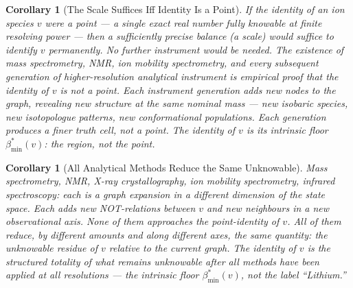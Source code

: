 \documentclass[11pt,twocolumn,a4paper]{article}
\theoremstyle{plain}
\newtheorem{corollary}[theorem]{Corollary}
\theoremstyle{definition}
\theoremstyle{remark}
\newcommand{\bmin}{\beta_{\min}}
\begin{document}
\begin{corollary}[The Scale Suffices Iff Identity Is a Point]
\label{cor:scale}
If the identity of an ion species $v$ were a point --- a single exact real
number fully knowable at finite resolving power --- then a sufficiently
precise balance (a scale) would suffice to identify $v$ permanently. No
further instrument would be needed. The existence of mass spectrometry, NMR,
ion mobility spectrometry, and every subsequent generation of higher-resolution
analytical instrument is empirical proof that the identity of $v$ is not a
point. Each instrument generation adds new nodes to the graph, revealing new
structure at the same nominal mass --- new isobaric species, new isotopologue
patterns, new conformational populations. Each generation produces a finer
truth cell, not a point. The identity of $v$ is its intrinsic floor
$\bmin^*(v)$: the region, not the point.
\end{corollary}

\begin{corollary}[All Analytical Methods Reduce the Same Unknowable]
\label{cor:all_methods}
Mass spectrometry, NMR, X-ray crystallography, ion mobility spectrometry,
infrared spectroscopy: each is a graph expansion in a different dimension
of the state space. Each adds new NOT-relations between $v$ and new
neighbours in a new observational axis. None of them approaches the
point-identity of $v$. All of them reduce, by different amounts and along
different axes, the same quantity: the unknowable residue of $v$ relative
to the current graph. The identity of $v$ is the structured totality of
what remains unknowable after all methods have been applied at all
resolutions --- the intrinsic floor $\bmin^*(v)$, not the label ``Lithium.''
\end{corollary}
\end{document}
